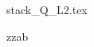 \documentclass{exam}
\begin{document}


\begin{questions}

         \printanswers


     {stack_Q_L2.tex}





              \question  zzab



\end{questions}
\end{document}
